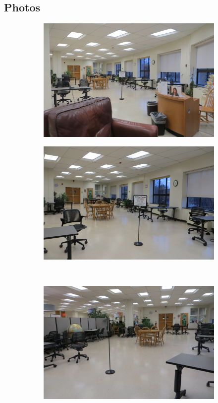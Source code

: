 \documentclass[12pt]{article} %
\begin{document}
\begin{samepage}
\section{Photos} %
  \begin{figure}[H]
  \begin{subfigure}{.5\linewidth}
  \centering
  \includegraphics[width=0.75\linewidth]{WC1}
  \caption{}
  \label{fig:WC1}
  \end{subfigure}%
  \begin{subfigure}{.5\linewidth}
  \centering
  \includegraphics[width=0.75\linewidth]{WC2}
  \caption{}
  \label{fig:WC2}
  \end{subfigure}\\[1ex]
  \begin{subfigure}{.5\linewidth}
  \centering
  \includegraphics[width=0.75\linewidth]{WC3}

\end{subfigure}
\end{figure}
\end{samepage}
\end{document}
